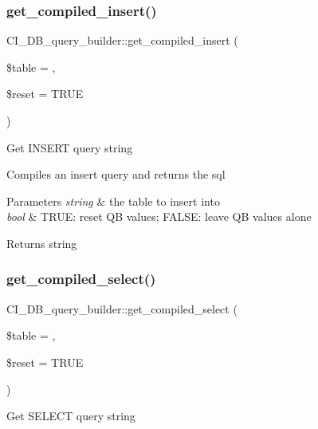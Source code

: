 \subsubsection{\texorpdfstring{get\+\_\+compiled\+\_\+insert()}{get\_compiled\_insert()}}
{\footnotesize\ttfamily C\+I\+\_\+\+D\+B\+\_\+query\+\_\+builder\+::get\+\_\+compiled\+\_\+insert (\begin{DoxyParamCaption}\item[{}]{\$table = {\ttfamily \textquotesingle{}\textquotesingle{}},  }\item[{}]{\$reset = {\ttfamily TRUE} }\end{DoxyParamCaption})}

Get I\+N\+S\+E\+RT query string

Compiles an insert query and returns the sql


\begin{DoxyParams}{Parameters}
{\em string} & the table to insert into \\
\hline
{\em bool} & T\+R\+UE\+: reset QB values; F\+A\+L\+SE\+: leave QB values alone \\
\hline
\end{DoxyParams}
\begin{DoxyReturn}{Returns}
string 
\end{DoxyReturn}
\mbox{\label{class_c_i___d_b__query__builder_a0c676ca7dd63a7c77741a154e9acf936}} 
\subsubsection{\texorpdfstring{get\+\_\+compiled\+\_\+select()}{get\_compiled\_select()}}
{\footnotesize\ttfamily C\+I\+\_\+\+D\+B\+\_\+query\+\_\+builder\+::get\+\_\+compiled\+\_\+select (\begin{DoxyParamCaption}\item[{}]{\$table = {\ttfamily \textquotesingle{}\textquotesingle{}},  }\item[{}]{\$reset = {\ttfamily TRUE} }\end{DoxyParamCaption})}

Get S\+E\+L\+E\+CT query string

